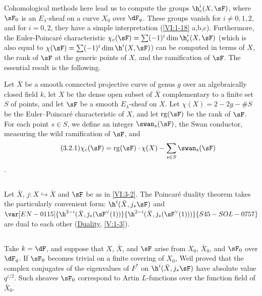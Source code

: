 Cohomological methods here lead us to compute the groups 
$\h_c^i(X,\sF)$, where $\sF_0$ is an $E_\lambda$-sheaf on a curve $X_0$ over 
$\dF_q$. These groups vanish for $i\ne 0,1,2$, and for 
$i=0,2$, they have a simple interpretation (\ref{VI:1-18} a,b,c). Furthermore, the 
Euler-Poincaré characteristic 
$\chi_c(\sF) = \sum (-1)^i \dim \h_c^i(X,\sF)$ (which is also equal to 
$\chi(\sF) = \sum (-1)^i \dim \h^i(X,\sF)$) can be computed in terms of 
$X$, the rank of $\sF$ at the generic points of $X$, and the 
ramification of $\sF$. The essential result is the following. 

Let $\bar X$ be a smooth connected projective curve of genus $g$ over an 
algebraically closed field $k$, let $X$ be the dense open subset of $\bar X$ 
complementary to a finite set $S$ of points, and let $\sF$ be a 
smooth $E_\lambda$-sheaf on $X$. Let $\chi(X)=2-2 g-\# S$ be the 
Euler--Poincaré characteristic of $X$, and let $\operatorname{rg}(\sF)$ be the 
rank of $\sF$. For each point $s\in S$, we define an integer 
$\swan_s(\sF)$, the Swan conductor, measuring the wild ramification of 
$\sF$, and 
\begin{align*}\tag{3.2.1}\label{VI:eq:3-2-1}
  \chi_c(\sF) = \operatorname{rg}(\sF) \cdot \chi(X) - \sum_{s\in S} \swan_s(\sF) 
\end{align*}
. 





\subsection{}\label{VI:3-3}

Let $\bar X$, $j:X\hookrightarrow\bar X$ and $\sF$ be as in \ref{VI:3-2}. The 
Poincaré duality theorem takes the particularly convenient form: 
$\h^i(\bar X,j_\ast \sF)$ and $\var[EN-0115]{\h^{2-i}(\bar X,j_\ast(\sF^\vee(1))}{\h^{2-i}(\bar X,j_\ast(\sF^\vee(1)))}{S45-SOL-0757}$ are 
dual to each other (\hyperref[V]{Duality}, \ref{V:1-3}). 






\subsection{}\label{VI:3-4}

Take $k=\dF$, and suppose that $X$, $\bar X$, and $\sF$ arise from 
$X_0$, $\bar X_0$, and $\sF_0$ over $\dF_q$. If $\sF_0$ becomes trivial on a 
finite covering of $X_0$, Weil proved that the complex conjugates of 
the eigenvalues of $F^\ast$ on $\h^i(\bar X,j_\ast\sF)$ have absolute value 
$q^{i/2}$. Such sheaves $\sF_0$ correspond to Artin $L$-functions 
over the function field of $\bar X_0$. 





